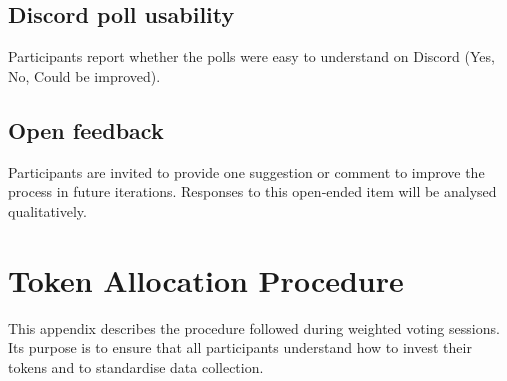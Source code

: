 \subsection*{Discord poll usability}
Participants report whether the polls were easy to understand on Discord
(Yes, No, Could be improved).

\subsection*{Open feedback}
Participants are invited to provide one suggestion or comment to improve
the process in future iterations.  Responses to this open‑ended item will
be analysed qualitatively.

\section{Token Allocation Procedure}
\label{appendix:token}

This appendix describes the procedure followed during weighted voting
sessions.  Its purpose is to ensure that all participants understand
how to invest their tokens and to standardise data collection.


